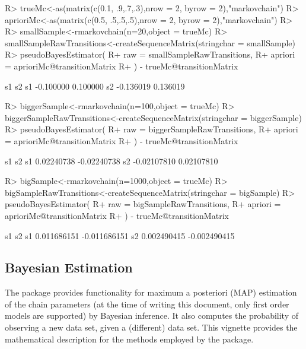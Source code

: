 \documentclass[
  nojss]{jss}
\begin{document}
\begin{CodeChunk}

\begin{CodeInput}
R> trueMc<-as(matrix(c(0.1, .9,.7,.3),nrow = 2, byrow = 2),"markovchain")
R> aprioriMc<-as(matrix(c(0.5, .5,.5,.5),nrow = 2, byrow = 2),"markovchain")
R> 
R> smallSample<-rmarkovchain(n=20,object = trueMc)
R> smallSampleRawTransitions<-createSequenceMatrix(stringchar = smallSample)
R> pseudoBayesEstimator(
R+   raw = smallSampleRawTransitions, 
R+   apriori = aprioriMc@transitionMatrix
R+ ) - trueMc@transitionMatrix
\end{CodeInput}

\begin{CodeOutput}
          s1       s2
s1 -0.100000 0.100000
s2 -0.136019 0.136019
\end{CodeOutput}

\begin{CodeInput}
R> biggerSample<-rmarkovchain(n=100,object = trueMc)
R> biggerSampleRawTransitions<-createSequenceMatrix(stringchar = biggerSample)
R> pseudoBayesEstimator(
R+   raw = biggerSampleRawTransitions,
R+   apriori = aprioriMc@transitionMatrix
R+ ) - trueMc@transitionMatrix
\end{CodeInput}

\begin{CodeOutput}
            s1          s2
s1  0.02240738 -0.02240738
s2 -0.02107810  0.02107810
\end{CodeOutput}

\begin{CodeInput}
R> bigSample<-rmarkovchain(n=1000,object = trueMc)
R> bigSampleRawTransitions<-createSequenceMatrix(stringchar = bigSample)
R> pseudoBayesEstimator(
R+   raw = bigSampleRawTransitions,
R+   apriori = aprioriMc@transitionMatrix
R+ ) - trueMc@transitionMatrix
\end{CodeInput}

\begin{CodeOutput}
            s1           s2
s1 0.011686151 -0.011686151
s2 0.002490415 -0.002490415
\end{CodeOutput}
\end{CodeChunk}

\hypertarget{bayesian-estimation}{%
\subsection{Bayesian Estimation}\label{bayesian-estimation}}

The  package provides functionality for maximum a posteriori (MAP) estimation of the chain parameters (at the time of writing this document, only first order models are supported) by Bayesian inference. It also computes the probability of observing a new data set, given a (different) data set. This vignette provides the mathematical description for the methods employed by the package.
\end{document}
